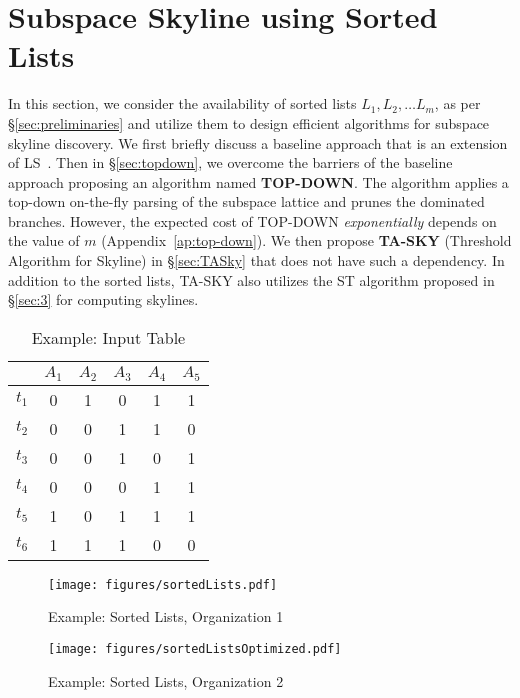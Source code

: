 \section{Subspace Skyline using Sorted \\ Lists} \label{sec:subsky}

In this section, we consider the availability of sorted lists $L_1, L_2, \ldots L_m$, as per \S\ref{sec:preliminaries} and utilize them to design efficient algorithms for subspace skyline discovery.
We first briefly discuss a baseline approach that is an extension of LS~\cite{morse2007efficient}.
Then in \S\ref{sec:topdown}, we overcome the barriers of the baseline approach proposing an algorithm named {\bf TOP-DOWN}. The algorithm applies a top-down on-the-fly parsing of the subspace lattice and prunes the dominated branches.
However, the expected cost of TOP-DOWN {\em exponentially} depends on the value of $m$  (Appendix~\ref{ap:top-down}).
We then propose {\bf TA-SKY} (Threshold Algorithm for Skyline) in \S\ref{sec:TASky} that does not have such a dependency. In addition to the sorted lists, TA-SKY also utilizes the ST algorithm proposed in \S\ref{sec:3} for computing skylines.

\begin{table}[!t]
\centering
\caption{Example: Input Table}\label{tab:runningExampleSubspaceSkyline}
\begin{tiny}
\begin{tabular}{cccccc}
    \hline 
     & $A_1$ & $A_2$ & $A_3$ & $A_4$ & $A_5$ \\
    \hline 
    $t_1$ & 0 & 1 & 0 & 1 & 1\\
    \hline
    $t_2$ & 0 & 0 & 1 & 1 & 0\\
    \hline
    $t_3$ & 0 & 0 & 1 & 0 & 1\\
    \hline
    $t_4$ & 0 & 0 & 0 & 1 & 1\\
    \hline
    $t_5$ & 1 & 0 & 1 & 1 & 1\\
    \hline
    $t_6$ & 1 & 1 & 1 & 0 & 0\\
    \hline
\end{tabular}
\end{tiny}
\end{table}


\begin{figure}[!ht]
  \begin{minipage}[t]{0.49\linewidth}
    \centering
    \texttt{[image: figures/sortedLists.pdf]}
    \caption{Example: Sorted Lists, Organization 1} 
    \label{fig:sortedLists}
  \end{minipage}
  \hspace{1mm}
  \begin{minipage}[t]{0.49\linewidth}
    \centering
    \texttt{[image: figures/sortedListsOptimized.pdf]}
    \caption{Example: Sorted Lists, Organization 2}
    \label{fig:sortedListsOptimized}
  \end{minipage}
\end{figure}

